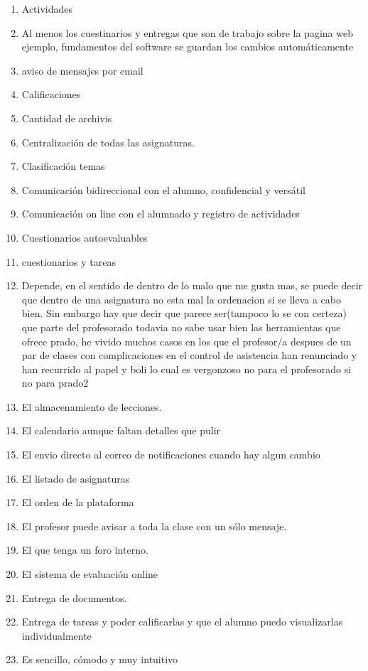 \begin{enumerate}
\item Actividades
\item Al menos los cuestinarios y entregas que son de trabajo sobre la pagina web ejemplo, fundamentos del software se guardan los cambios automáticamente
\item aviso de mensajes por email
\item Calificaciones
\item Cantidad de archivis
\item Centralización de todas las asignaturas.
\item Clasificación temas
\item Comunicación bidireccional con el alumno, confidencial y versátil
\item Comunicación on line con el alumnado y registro de actividades
\item Cuestionarios autoevaluables
\item cuestionarios y tareas
\item Depende, en el sentido de dentro de lo malo que me gusta mas, se puede decir que dentro de una asignatura no esta mal la ordenacion si se lleva a cabo bien. Sin embargo hay que decir que parece ser(tampoco lo se con certeza) que parte del profesorado todavia no sabe usar bien las herramientas que ofrece prado, he vivido muchos casos en los que el profesor/a despues de un par de clases con complicaciones en el control de asistencia han renunciado y han recurrido al papel y boli lo cual es vergonzoso no para el profesorado si no para prado2
\item El almacenamiento de lecciones.
\item El calendario aunque faltan detalles que pulir
\item El envio directo al correo de notificaciones cuando hay algun cambio
\item El listado de asignaturas
\item El orden de la plataforma
\item El profesor puede avisar a toda la clase con un sólo mensaje.
\item El que tenga un foro interno.
\item El sistema de evaluación online
\item Entrega de documentos.
\item Entrega de tareas y poder calificarlas y que el alumno puedo visualizarlas individualmente
\item Es sencillo, cómodo y muy intuitivo

\end{enumerate}
